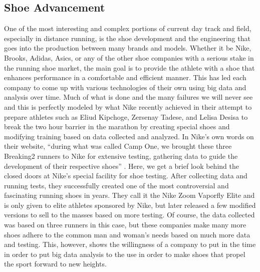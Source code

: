 \documentclass[sigconf]{acmart}
\begin{document}
\subsection{Shoe Advancement}
One of the most interesting and complex portions of current day track and field, especially in distance running, is the shoe development and the engineering that goes into the production between many brands and models. Whether it be Nike, Brooks, Adidas, Asics, or any of the other shoe companies with a serious stake in the running shoe market, the main goal is to provide the athlete with a shoe that enhances performance in a comfortable and efficient manner. This has led each company to come up with various technologies of their own using big data and analysis over time. Much of what is done and the many failures we will never see and this is perfectly modeled by what Nike recently achieved in their attempt to prepare athletes such as Eliud Kipchoge, Zersenay Tadese, and Lelisa Desisa to break the two hour barrier in the marathon by creating special shoes and modifying training based on data collected and analyzed. In Nike's own words on their website, ``during what was called Camp One, we brought these three Breaking2 runners to Nike for extensive testing, gathering data to guide the development of their respective shoes'' \cite{Innovation}. Here, we get a brief look behind the closed doors at Nike's special facility for shoe testing. After collecting data and running tests, they successfully created one of the most controversial and fascinating running shoes in years. They call it the Nike Zoom Vaporfly Elite and is only given to elite athletes sponsored by Nike, but later released a few modified versions to sell to the masses based on more testing. Of course, the data collected was based on three runners in this case, but these companies make many more shoes adhere to the common man and woman's needs based on much more data and testing. This, however, shows the willingness of a company to put in the time in order to put big data analysis to the use in order to make shoes that propel the sport forward to new heights.
\end{document}
